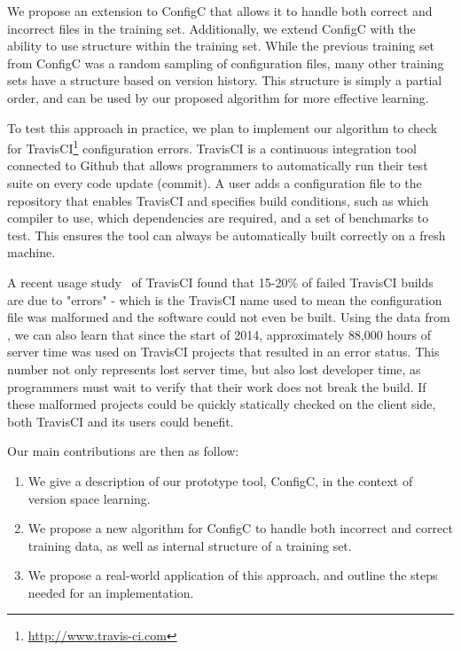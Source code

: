 We propose an extension to ConfigC that allows it to handle both correct and incorrect files in the training set.
Additionally, we extend ConfigC with the ability to use structure within the training set.
While the previous training set from ConfigC was a random sampling of configuration files, many other training sets have a structure based on version history.
This structure is simply a partial order, and can be used by our proposed algorithm for more effective learning.

To test this approach in practice, we plan to implement our algorithm to check for TravisCI\footnote{\url{http://www.travis-ci.com}} configuration errors.
TravisCI is a continuous integration tool connected to Github that allows programmers to automatically run their test suite on every code update (commit).
A user adds a configuration file to the repository that enables TravisCI and specifies build conditions, such as which compiler to use, which dependencies are required, and a set of benchmarks to test.
This ensures the tool can always be automatically built correctly on a fresh machine.

A recent usage study~\cite{API} of TravisCI found that 15-20\% of failed TravisCI builds are due to "errors" - which is the TravisCI name used to mean the configuration file was malformed and the software could not even be built.
Using the data from \cite{API}, we can also learn that since the start of 2014, approximately 88,000 hours of server time was used on TravisCI projects that resulted in an error status.
This number not only represents lost server time, but also lost developer time, as programmers must wait to verify that their work does not break the build.
If these malformed projects could be quickly statically checked on the client side, both TravisCI and its users could benefit.

Our main contributions are then as follow:

\begin{enumerate}

\item We give a description of our prototype tool, ConfigC, in the context of version space learning.
\item We propose a new algorithm for ConfigC to handle both incorrect and correct training data, as well as internal structure of a training set.
\item We propose a real-world application of this approach, and outline the steps needed for an implementation.

\end{enumerate} 
